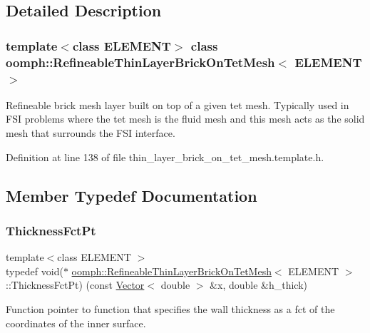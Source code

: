 \subsection{Detailed Description}
\subsubsection*{template$<$class E\+L\+E\+M\+E\+NT$>$\newline
class oomph\+::\+Refineable\+Thin\+Layer\+Brick\+On\+Tet\+Mesh$<$ E\+L\+E\+M\+E\+N\+T $>$}

Refineable brick mesh layer built on top of a given tet mesh. Typically used in F\+SI problems where the tet mesh is the fluid mesh and this mesh acts as the solid mesh that surrounds the F\+SI interface. 

Definition at line 138 of file thin\+\_\+layer\+\_\+brick\+\_\+on\+\_\+tet\+\_\+mesh.\+template.\+h.



\subsection{Member Typedef Documentation}
\mbox{\label{classoomph_1_1RefineableThinLayerBrickOnTetMesh_a744583cb70486874441d5a748f23168d}} 
\subsubsection{\texorpdfstring{Thickness\+Fct\+Pt}{ThicknessFctPt}}
{\footnotesize\ttfamily template$<$class E\+L\+E\+M\+E\+NT $>$ \\
typedef void($\ast$ \hyperlink{classoomph_1_1RefineableThinLayerBrickOnTetMesh}{oomph\+::\+Refineable\+Thin\+Layer\+Brick\+On\+Tet\+Mesh}$<$ E\+L\+E\+M\+E\+NT $>$\+::Thickness\+Fct\+Pt) (const \hyperlink{classoomph_1_1Vector}{Vector}$<$ double $>$ \&x, double \&h\+\_\+thick)}



Function pointer to function that specifies the wall thickness as a fct of the coordinates of the inner surface. 



